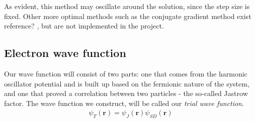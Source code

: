 \documentclass[11pt]{article}
\newcommand{\husk}[1]{\color{red} #1 \color{black}}
\begin{document}
As evident, this method may oscillate around the solution, since the step size is fixed. Other more optimal methods such as the conjugate gradient method exist\husk{reference?}, but are not implemented in the project.


\subsection{Electron wave function}
Our wave function will consist of two parts: one that comes from the harmonic oscillator potential and is built up based on the fermionic nature of the system, and one that proved a correlation between two particles - the so-called Jastrow factor. The wave function we construct, will be called our \textit{trial wave function}.
\begin{align}
	\psi_T(\mathbf{r}) = \psi_J(\mathbf{r})\psi_{SD}(\mathbf{r})
	\label{eq:WF_trial}
\end{align}
\end{document}
